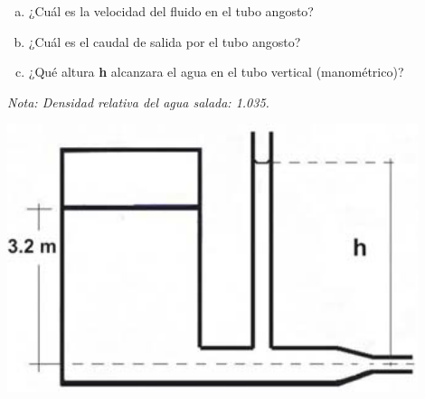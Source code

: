 \documentclass{article}
\begin{document}
\vspace{0.5cm}
\hspace{-0.7cm}
\begin{minipage}{0.65\textwidth}
\begin{enumerate}[a)]
\item ¿Cuál es la velocidad del fluido en el tubo angosto?
\item ¿Cuál es el caudal de salida por el tubo angosto?
\item ¿Qué altura \textbf{h} alcanzara el agua en el tubo vertical (manométrico)?
\end{enumerate}
\textit{Nota: Densidad relativa del agua salada: 1.035.}
\end{minipage}
\begin{minipage}{0.4\textwidth}
\includegraphics[width=0.9\textwidth]{imagen2.png}
\end{minipage}
\bigskip


\end{document}
